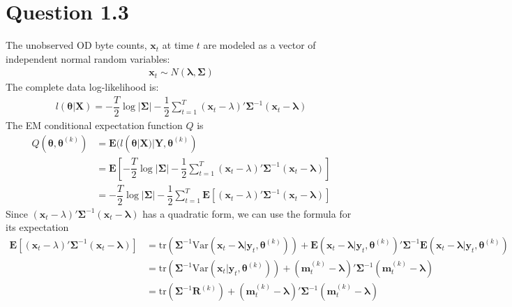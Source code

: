 \documentclass[10pt]{article}
\begin{document}
\section*{Question 1.3}
The unobserved OD byte counts, $\mathbf{x}_t$ at time $t$ are modeled as a vector of independent normal random variables:
\begin{align}
\mathbf{x}_t \sim N(\mathbf{\lambda}, \mathbf{\Sigma})
\end{align}
The complete data log-likelihood is:
\begin{align}
l(\mathbf{\theta}|\mathbf{X})=-\dfrac{T}{2}\log{|\mathbf{\Sigma}|}-\dfrac{1}{2}\sum_{t=1}^T (\mathbf{x}_t - \lambda)'\mathbf{\Sigma}^{-1}(\mathbf{x}_t-\mathbf{\lambda})
\end{align}
The EM conditional expectation function $Q$ is
\begin{align}
Q(\mathbf{\theta}, \mathbf{\theta}^{(k)}) &= \mathbf{E}(l(\mathbf{\theta}|\mathbf{X})|\mathbf{Y}, \mathbf{\theta}^{(k)})\\
&= \mathbf{E}\left[-\dfrac{T}{2}\log{|\mathbf{\Sigma}|} - \dfrac{1}{2}\sum_{t=1}^T (\mathbf{x}_t - \lambda)'\mathbf{\Sigma}^{-1}(\mathbf{x}_t-\mathbf{\lambda})\right]\\
&= -\dfrac{T}{2}\log{|\mathbf{\Sigma}|} - \dfrac{1}{2}\sum_{t=1}^T\mathbf{E}\left[ (\mathbf{x}_t - \lambda)'\mathbf{\Sigma}^{-1}(\mathbf{x}_t-\mathbf{\lambda})\right]
\end{align}
Since $(\mathbf{x}_t - \lambda)'\mathbf{\Sigma}^{-1}(\mathbf{x}_t-\mathbf{\lambda})$ has a quadratic form, we can use the formula for its expectation
\begin{align}
\mathbf{E}\left[(\mathbf{x}_t - \lambda)'\mathbf{\Sigma}^{-1}(\mathbf{x}_t-\mathbf{\lambda})\right]&=\mathrm{tr}\left(\mathbf{\Sigma}^{-1}\mathrm{Var}(\mathbf{x}_t-\mathbf{\lambda}|\mathbf{y}_t,\mathbf{\theta}^{(k)})\right) + \mathbf{E}(\mathbf{x}_t-\mathbf{\lambda}|\mathbf{y}_t,\mathbf{\theta}^{(k)})'\mathbf{\Sigma}^{-1}\mathbf{E}(\mathbf{x}_t-\mathbf{\lambda}|\mathbf{y}_t,\mathbf{\theta}^{(k)})\\
&=\mathrm{tr}\left(\mathbf{\Sigma}^{-1}\mathrm{Var}(\mathbf{x}_t|\mathbf{y}_t,\mathbf{\theta}^{(k)})\right) +(\mathbf{m}_t^{(k)}-\mathbf{\lambda})'\mathbf{\Sigma}^{-1}(\mathbf{m}_t^{(k)}-\mathbf{\lambda})\\
&=\mathrm{tr}\left(\mathbf{\Sigma}^{-1}\mathbf{R}^{(k)}\right) +(\mathbf{m}_t^{(k)}-\mathbf{\lambda})'\mathbf{\Sigma}^{-1}(\mathbf{m}_t^{(k)}-\mathbf{\lambda})
\end{align}
\end{document}
